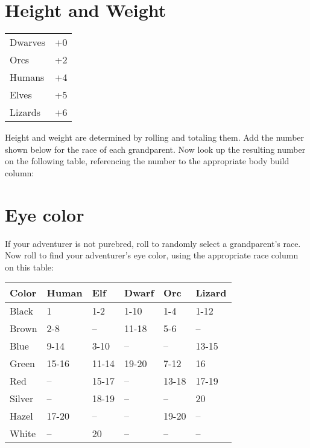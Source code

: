 \begin{multicols*}{2}
\section{Height and Weight}
\setlength{\columnsep}{-3.25cm}
\begin{multicols}{2}
\begin{normbox}
\small
{}
\begin{tabular}{l l}
Dwarves & +0\\
Orcs & +2\\
Humans & +4\\
Elves & +5\\
Lizards & +6\\
\end{tabular}
\end{normbox}

\normalsize
Height and weight are determined by rolling  and totaling them. Add the number shown below for the race of each grandparent. Now look up the resulting number on the following table, referencing the number to the appropriate body build column:

\end{multicols}

\begin{tcbraster}[raster columns=1,boxrule=0pt,title=\textbf{Height and Weight Table},left=0pt,right=0pt,top=0pt,bottom=0pt,boxsep=0pt,boxrule=0.6pt,lefttitle=2.5mm,toptitle=1mm,bottomtitle=1mm,colbacktitle=Navy,colback=white]
\end{tcbraster}
\normalsize
\section{Eye color}
If your adventurer is not purebred, roll  to randomly select a grandparent's race. Now roll  to find your adventurer's eye color, using the appropriate race column on this table:

\begin{normbox}
\begin{tabular}{l l l l l l}
\small
Color & Human & Elf & Dwarf & Orc & Lizard\\
\midrule
Black & 1 & 1-2 & 1-10 & 1-4 & 1-12\\
Brown & 2-8 & -- & 11-18 & 5-6 & --\\
Blue & 9-14 & 3-10 & -- & -- & 13-15\\
Green & 15-16 & 11-14 & 19-20 & 7-12 & 16\\
Red & -- & 15-17 & -- & 13-18 & 17-19\\
Silver & -- & 18-19 & -- & -- & 20\\
Hazel & 17-20 & -- & -- & 19-20 & --\\
White & -- & 20 & -- & -- & --
\end{tabular}
\end{normbox}

\end{multicols*}
